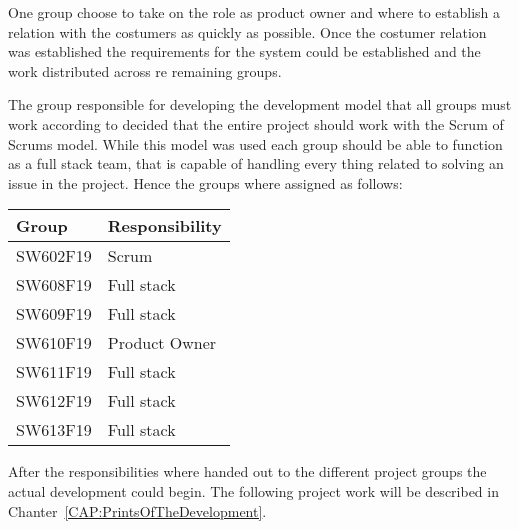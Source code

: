 One group choose to take on the role as product owner and where to establish a relation with the costumers as quickly as possible. 
Once the costumer relation was established the requirements for the system could be established and the work distributed across re remaining groups.

The group responsible for developing the development model that all groups must work according to decided that the entire project should work with the Scrum of Scrums model.
While this model was used each group should be able to function as a full stack team, that is capable of handling every thing related to solving an issue in the project.
Hence the groups where assigned as follows:

\begin{table}[H]
\centering
\begin{tabular}{|l|l|}
\hline
\textbf{Group} & \textbf{Responsibility} \\ \hline
SW602F19 & Scrum\\ \hline
SW608F19 & Full stack\\ \hline
SW609F19 & Full stack\\ \hline
SW610F19 & Product Owner  \\ \hline
SW611F19 & Full stack \\ \hline
SW612F19 & Full stack \\ \hline
SW613F19 & Full stack \\ \hline
\end{tabular}
\end{table}

After the responsibilities where handed out to the different project groups the actual development could begin.
The following project work will be described in Chanter~\ref{CAP:PrintsOfTheDevelopment}.